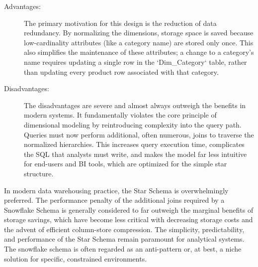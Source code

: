 \begin{description}
    \item[Advantages:] The primary motivation for this design is the reduction of data redundancy. By normalizing the dimensions, storage space is saved because low-cardinality attributes (like a category name) are stored only once. This also simplifies the maintenance of these attributes; a change to a category's name requires updating a single row in the `Dim\_Category` table, rather than updating every product row associated with that category.
    \item[Disadvantages:] The disadvantages are severe and almost always outweigh the benefits in modern systems. It fundamentally violates the core principle of dimensional modeling by reintroducing complexity into the query path. Queries must now perform additional, often numerous, joins to traverse the normalized hierarchies. This increases query execution time, complicates the SQL that analysts must write, and makes the model far less intuitive for end-users and BI tools, which are optimized for the simple star structure.
\end{description}
\begin{remark}
In modern data warehousing practice, the Star Schema is overwhelmingly preferred. The performance penalty of the additional joins required by a Snowflake Schema is generally considered to far outweigh the marginal benefits of storage savings, which have become less critical with decreasing storage costs and the advent of efficient column-store compression. The simplicity, predictability, and performance of the Star Schema remain paramount for analytical systems. The snowflake schema is often regarded as an anti-pattern or, at best, a niche solution for specific, constrained environments.
\end{remark}

